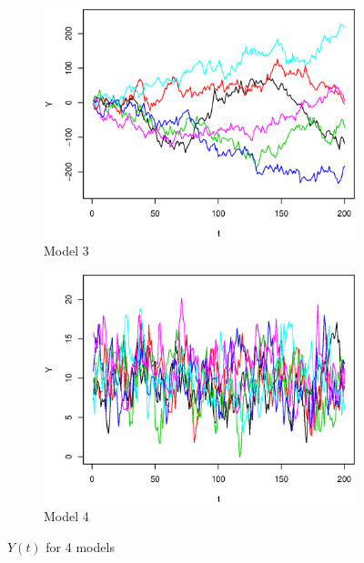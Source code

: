 \documentclass{article}
\begin{document}
\begin{figure}[!htb]
 	\\
 	\begin{subfigure}[b]{0.45\textwidth}
 	\includegraphics[width = \textwidth]{Model3.eps}
 	\caption{Model 3}
 	\end{subfigure}%
 	\begin{subfigure}[b]{0.45\textwidth}
 	\includegraphics[width = \textwidth]{Model4.eps}
 	\caption{Model 4}
 	\end{subfigure}
 	\caption{$Y(t)$ for 4 models}
 	\label{series}
 \end{figure} 
\end{document}
